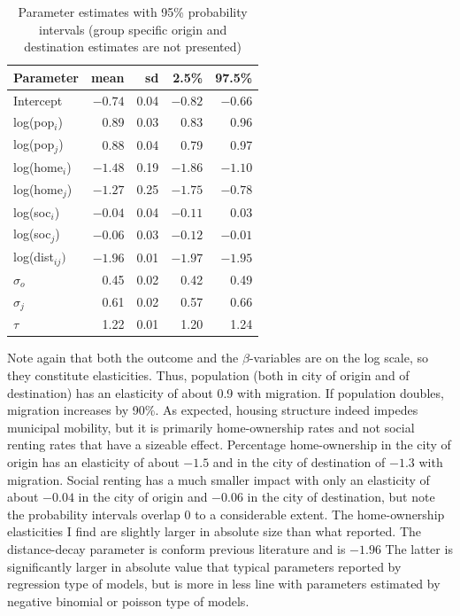 \documentclass[fleqn,10pt]{SelfArx} %
\begin{document}
{{%
\begin{table}[ht]
  \centering
  \caption{Parameter estimates with 95\% probability intervals (group specific origin and destination estimates are not presented)}
  \label{tab:coef}
  \begin{tabular}{lrrrr}
    \toprule
    Parameter & mean & sd & 2.5\% & 97.5\% \\ 
    \midrule
    Intercept      & $-0.74$ & 0.04 & $-0.82$ & $-0.66$ \\ 
    log(pop$_i$)   & 0.89 & 0.03 & 0.83 & 0.96 \\ 
    log(pop$_j$)   & 0.88 & 0.04 & 0.79 & 0.97 \\ 
    log(home$_i$)  & $-1.48$ & 0.19 & $-1.86$ & $-1.10$ \\ 
    log(home$_j$)  & $-1.27$ & 0.25 & $-1.75$ & $-0.78$ \\ 
    log(soc$_i$)   & $-0.04$ & 0.04 & $-0.11$ & 0.03 \\
    log(soc$_j$)   & $-0.06$ & 0.03 & $-0.12$ & $-0.01$ \\ 
    log(dist$_{ij})$ & $-1.96$ & 0.01 & $-1.97$ & $-1.95$ \\ 
    $\sigma_o$    & 0.45 & 0.02 & 0.42 & 0.49 \\ 
    $\sigma_j$    & 0.61 & 0.02 & 0.57 & 0.66 \\ 
    $\tau$        & 1.22 & 0.01 & 1.20 & 1.24 \\ 
    \bottomrule
  \end{tabular}
\end{table}
\noindent Note again that both the outcome and the $\beta$-variables are on the
log scale, so they constitute elasticities.  Thus, population (both in city of
origin and of destination) has an elasticity of about 0.9 with migration. If
population doubles, migration increases by 90\%.  As expected, housing structure
indeed impedes municipal mobility, but it is primarily home-ownership rates and
not social renting rates that have a sizeable effect. Percentage home-ownership
in the city of origin has an elasticity of about $-1.5$ and in the city of
destination of $-1.3$ with migration. Social renting has a much smaller impact
with only an elasticity of about $-0.04$ in the city of origin and $-0.06$ in
the city of destination, but note the probability intervals overlap 0 to a
considerable extent. The home-ownership elasticities I find are slightly larger
in absolute size than what \citet{amirault2016drags} reported. The
distance-decay parameter is conform previous literature and is $-1.96$ The
latter is significantly larger in absolute value that typical parameters
reported by regression type of models, but is more in less line with parameters
estimated by negative binomial or poisson type of models.

}}
\end{document}
